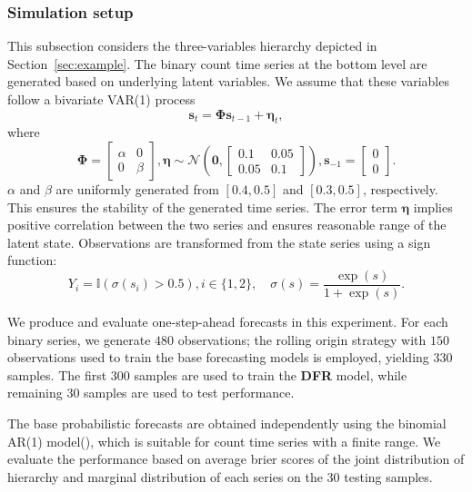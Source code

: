 \documentclass[a4paper,review,12pt,authoryear]{elsarticle}
\begin{document}
    \subsubsection{Simulation setup}
    This subsection considers the three-variables hierarchy depicted in Section~\ref{sec:example}.
    The binary count time series at the bottom level are generated based on underlying latent variables. 
    We assume that these variables follow a bivariate VAR(1) process
    \[\mathbf{s}_t = \mathbf{\Phi}\mathbf{s}_{t-1}+\boldsymbol{\eta}_t,\]
    where
    \[
      \mathbf{\Phi} = \left[\begin{matrix}
        \alpha & 0 \\
        0 & \beta
      \end{matrix}\right], \boldsymbol{\eta} \sim \mathcal{N}\left(\mathbf{0}, \left[\begin{matrix}
        0.1 & 0.05 \\
        0.05 & 0.1 
      \end{matrix}\right]\right), \mathbf{s}_{-1} = \left[
        \begin{matrix}0 \\ 0\end{matrix}
      \right].
    \]
    $\alpha$ and $\beta$ are uniformly generated from $[0.4, 0.5]$ and $[0.3,0.5]$, respectively. 
    This ensures the stability of the generated time series.
    The error term $\boldsymbol{\eta}$ implies positive correlation between the two series and ensures reasonable range of the latent state.
    Observations are transformed from the state series using a sign function:
    \[
        Y_i = \mathbb{I}(\sigma(s_i) > 0.5), i\in\{1, 2\},\quad \sigma(s) = \frac{\exp(s)}{1+\exp(s)}.
    \]

    We produce and evaluate one-step-ahead forecasts in this experiment.
    For each binary series, we generate $480$ observations; the rolling origin strategy with $150$ observations used to train the base forecasting models is employed, yielding $330$ samples.
    The first $300$ samples are used to train the \textbf{DFR} model, while remaining $30$ samples are used to test performance.
    
    The base probabilistic forecasts are obtained independently using the binomial AR(1) model(\citealp{weissParameterEstimationBinomial2013}), which is suitable for count time series with a finite range.
    We evaluate the performance based on average brier scores of the joint distribution of hierarchy and marginal distribution of each series on the $30$ testing samples.
     
\end{document}
